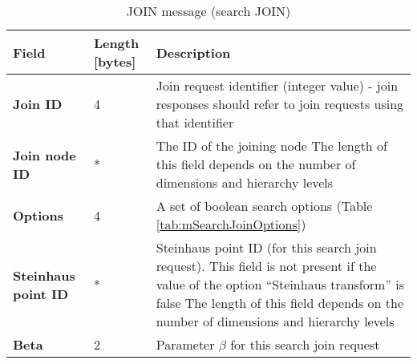 \begin{table}[H]
\scriptsize
\begin{center}
\begin{tabular}{p{3cm} p{2cm} p{9.5cm}}
	\hline
	\textbf{Field}						& \textbf{Length} [bytes]				& \textbf{Description}				\\[1mm]
    \hline
    \textbf{Join ID}					& 4										& Join request identifier (integer value) - join responses should refer to join requests using that identifier					\\[1.5mm]
	\textbf{Join node ID}				& *										& The ID of the joining node \newline * The length of this field depends on the number of dimensions and hierarchy levels					\\[1.5mm]	
	\textbf{Options}					& 4										& A set of boolean search options (Table \ref{tab:mSearchJoinOptions})				\\[1.5mm]
	\textbf{Steinhaus point ID} \newline [optional]		& *						& Steinhaus point ID (for this search join request). This field is not present if the value of the option ``Steinhaus transform'' is false \newline * The length of this field depends on the number of dimensions and hierarchy levels					\\[1.5mm]	
	\textbf{Beta}						& 2										& Parameter $\beta$ for this search join request				\\[1.5mm]
    \hline
\end{tabular}
\end{center}
\caption{JOIN message (search JOIN)}
\label{tab:mSearchJoin}
\end{table}

